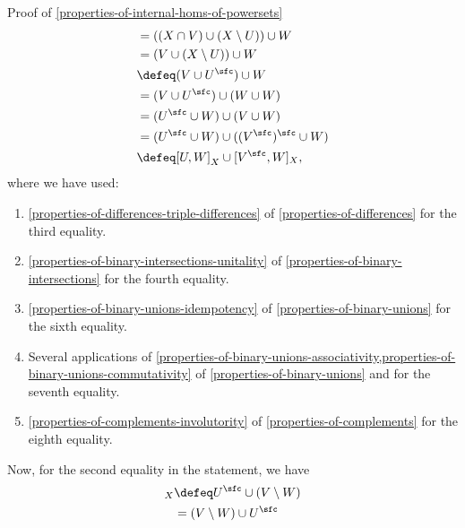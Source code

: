 \begin{Proof}{Proof of \cref{properties-of-internal-homs-of-powersets}}
\begin{align*}
                             &=      ((X\cap V)\cup(X\setminus U))\cup W\\
                             &=      (V\cup(X\setminus U))\cup W\\
                             &\defeq (V\cup U^{\sfc})\cup W\\
                             &=      (V\cup U^{\sfc})\cup(W\cup W)\\
                             &=      (U^{\sfc}\cup W)\cup(V\cup W)\\
                             &=      (U^{\sfc}\cup W)\cup((V^{\sfc})^{\sfc}\cup W)\\
                             &\defeq [U,W]_{X}\cup[V^{\sfc},W]_{X},
    \end{align*}
    where we have used:
    \begin{enumerate}
        \item\label{proof-of-properties-of-internal-homs-of-powersets-interaction-with-differences-5}\cref{properties-of-differences-triple-differences} of \cref{properties-of-differences} for the third equality.
        \item\label{proof-of-properties-of-internal-homs-of-powersets-interaction-with-differences-6}\cref{properties-of-binary-intersections-unitality} of \cref{properties-of-binary-intersections} for the fourth equality.
        \item\label{proof-of-properties-of-internal-homs-of-powersets-interaction-with-differences-7}\cref{properties-of-binary-unions-idempotency} of \cref{properties-of-binary-unions} for the sixth equality.
        \item\label{proof-of-properties-of-internal-homs-of-powersets-interaction-with-differences-8}Several applications of \cref{properties-of-binary-unions-associativity,properties-of-binary-unions-commutativity} of \cref{properties-of-binary-unions} and for the seventh equality.
        \item\label{proof-of-properties-of-internal-homs-of-powersets-interaction-with-differences-9}\cref{properties-of-complements-involutority} of \cref{properties-of-complements} for the eighth equality.
    \end{enumerate}
    Now, for the second equality in the statement, we have
    \begin{align*}
        [U,V\setminus W]_{X} &\defeq U^{\sfc}\cup(V\setminus W)\\
                             &=      (V\setminus W)\cup U^{\sfc}\\

\end{align*}
\end{Proof}
